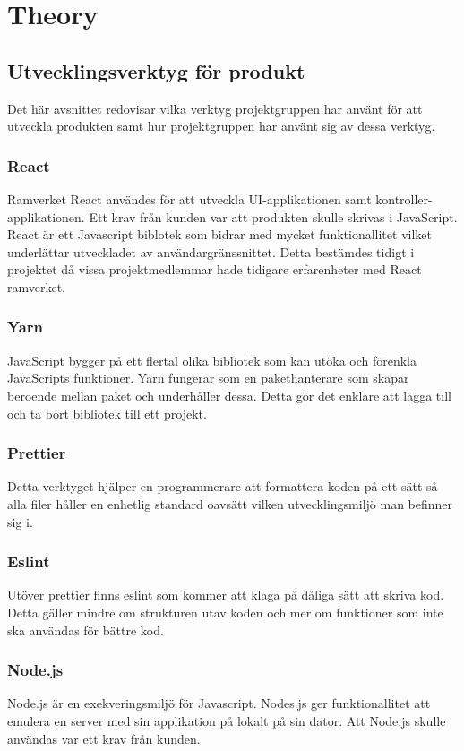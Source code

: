 \chapter{Theory}
\label{cha:theory}

\section{Utvecklingsverktyg för produkt}
Det här avsnittet redovisar vilka verktyg projektgruppen har använt för att utveckla produkten samt hur projektgruppen har använt sig av dessa verktyg.

\subsection*{React}
Ramverket React användes för att utveckla UI-applikationen samt kontroller-applikationen. Ett krav från kunden var att produkten skulle skrivas i JavaScript. React är ett Javascript biblotek som bidrar med mycket funktionallitet vilket underlättar utveckladet av användargränssnittet.  Detta bestämdes tidigt i projektet då vissa projektmedlemmar hade tidigare erfarenheter med React ramverket.

\subsection*{Yarn}
JavaScript bygger på ett flertal olika bibliotek som kan utöka och förenkla JavaScripts funktioner. Yarn fungerar som en pakethanterare som skapar beroende mellan paket och underhåller dessa. Detta gör det enklare att lägga till och ta bort bibliotek till ett projekt.

\subsection*{Prettier}
Detta verktyget hjälper en programmerare att formattera koden på ett sätt så alla filer håller en enhetlig standard oavsätt vilken utvecklingsmiljö man befinner sig i.

\subsection*{Eslint}
Utöver prettier finns eslint som kommer att klaga på dåliga sätt att skriva kod. Detta gäller mindre om strukturen utav koden och mer om funktioner som inte ska användas för bättre kod.

\subsection*{Node.js}
Node.js är en exekveringsmiljö för Javascript. Nodes.js ger funktionallitet att emulera en server med sin applikation på lokalt på sin dator. Att Node.js skulle användas var ett krav från kunden.

